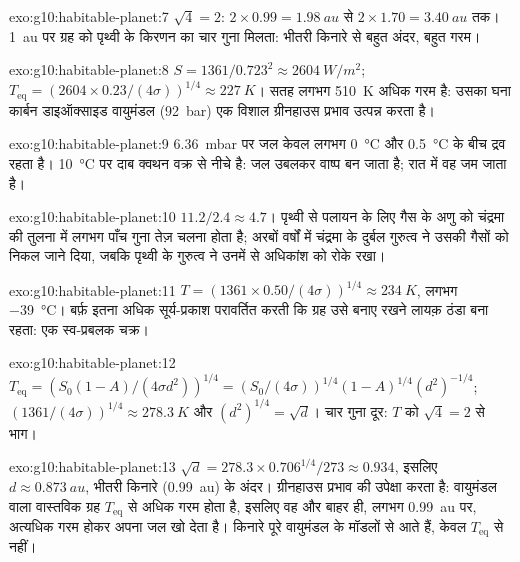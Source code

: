 \begin{solution}{exo:g10:habitable-planet:7}
$\sqrt 4 = 2$: $2 \times 0.99 = \qty{1.98}{au}$ से $2 \times 1.70 =
\qty{3.40}{au}$ तक। \qty{1}{au} पर ग्रह को पृथ्वी के किरणन का चार गुना मिलता:
भीतरी किनारे से बहुत अंदर, बहुत गरम।
\end{solution}

\begin{solution}{exo:g10:habitable-planet:8}
$S = 1361/0.723^2 \approx \qty{2604}{W/m^2}$;
$T_{\mathrm{eq}} = (2604 \times 0.23/(4\sigma))^{1/4} \approx \qty{227}{K}$।
सतह लगभग \qty{510}{K} अधिक गरम है: उसका घना कार्बन डाइऑक्साइड वायुमंडल
(\qty{92}{bar}) एक विशाल ग्रीनहाउस प्रभाव उत्पन्न करता है।
\end{solution}

\begin{solution}{exo:g10:habitable-planet:9}
\qty{6.36}{mbar} पर जल केवल लगभग \qty{0}{\degreeCelsius}
और \qty{0.5}{\degreeCelsius} के बीच द्रव रहता है। \qty{10}{\degreeCelsius} पर दाब
क्वथन वक्र से नीचे है: जल उबलकर वाष्प बन जाता है; रात में वह जम जाता है।
\end{solution}

\begin{solution}{exo:g10:habitable-planet:10}
$11.2/2.4 \approx 4.7$। पृथ्वी से पलायन के लिए गैस के अणु को चंद्रमा की तुलना में लगभग
पाँच गुना तेज़ चलना होता है; अरबों वर्षों में चंद्रमा के दुर्बल गुरुत्व ने उसकी गैसों को निकल
जाने दिया, जबकि पृथ्वी के गुरुत्व ने उनमें से अधिकांश को रोके रखा।
\end{solution}

\begin{solution}{exo:g10:habitable-planet:11}
$T = (1361 \times 0.50/(4\sigma))^{1/4} \approx \qty{234}{K}$, लगभग
\qty{-39}{\degreeCelsius}। बर्फ़ इतना अधिक सूर्य-प्रकाश परावर्तित करती कि ग्रह उसे बनाए
रखने लायक़ ठंडा बना रहता: एक स्व-प्रबलक चक्र।
\end{solution}

\begin{solution}{exo:g10:habitable-planet:12}
$T_{\mathrm{eq}} = (S_0(1-A)/(4\sigma d^2))^{1/4} = (S_0/(4\sigma))^{1/4}
(1-A)^{1/4} (d^2)^{-1/4}$; $(1361/(4\sigma))^{1/4} \approx \qty{278.3}{K}$ और
$(d^2)^{1/4} = \sqrt d$। चार गुना दूर: $T$ को $\sqrt 4 = 2$ से भाग।
\end{solution}

\begin{solution}{exo:g10:habitable-planet:13}
$\sqrt d = 278.3 \times 0.706^{1/4}/273 \approx 0.934$, इसलिए $d \approx
\qty{0.873}{au}$, भीतरी किनारे (\qty{0.99}{au}) के अंदर।  ग्रीनहाउस प्रभाव की उपेक्षा करता है: वायुमंडल वाला वास्तविक ग्रह
$T_{\mathrm{eq}}$ से अधिक गरम होता है, इसलिए वह और बाहर ही, लगभग \qty{0.99}{au} पर,
अत्यधिक गरम होकर अपना जल खो देता है। किनारे पूरे वायुमंडल के मॉडलों से आते हैं,
केवल $T_{\mathrm{eq}}$ से नहीं।
\end{solution}

